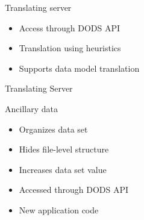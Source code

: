 \begin{slide}{}
Translating server
\begin{itemize}
\item Access through DODS API
\item Translation using heuristics
\item Supports data model translation
\end{itemize}
\end{slide}


\begin{slide}{}
\centerline{}
\centerline{Translating Server}
\end{slide}


\begin{slide}{}
Ancillary data
\begin{itemize}
\item Organizes data set
\item Hides file-level structure 
\item Increases data set value
\item Accessed through DODS API
\item New application code
\end{itemize}
\end{slide}
